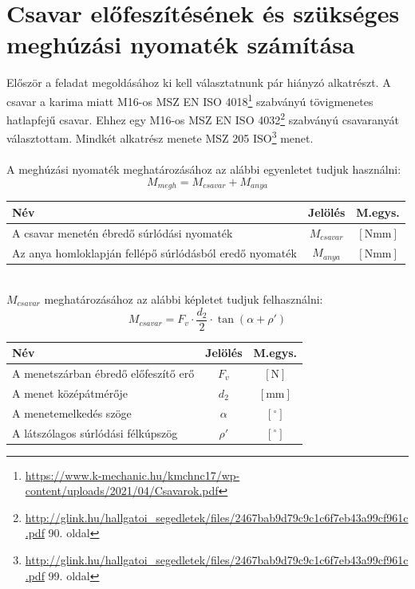 \documentclass[10pt, a4paper]{article}
\newcommand{\n}{\mathrm{\left[N\right]}}
\newcommand{\mm}{\mathrm{\left[mm\right]}}
\newcommand{\nmm}{\mathrm{\left[Nmm\right]}}
\newcommand{\szog}{\mathrm{\left[^{\circ}\right]}}
\begin{document}
	\section{Csavar előfeszítésének és szükséges meghúzási nyomaték számítása}
	Először a feladat megoldásához ki kell választatnunk pár hiányzó alkatrészt. A csavar a karima miatt M16-os MSZ EN ISO 4018\footnote{\url{https://www.k-mechanic.hu/kmchnc17/wp-content/uploads/2021/04/Csavarok.pdf}} szabványú tövigmenetes hatlapfejű csavar. Ehhez egy M16-os MSZ EN ISO 4032\footnote{\url{http://glink.hu/hallgatoi_segedletek/files/2467bab9d79c9c1c6f7eb43a99cf961c.pdf} 90. oldal} szabványú csavaranyát választottam. Mindkét alkatrész menete MSZ 205 ISO\footnote{\url{http://glink.hu/hallgatoi_segedletek/files/2467bab9d79c9c1c6f7eb43a99cf961c.pdf} 99. oldal} menet.\\\\
	A meghúzási nyomaték meghatározásához az alábbi egyenletet tudjuk használni:
	\begin{equation}
		M_{megh} = M_{csavar} + M_{anya} \tag{5}
	\end{equation}
	\vspace{-20pt}
	\renewcommand{\arraystretch}{1.4}
					\begin{table}[!h]
						\centering
						\begin{tabular}{l|c|c}
							\textbf{Név}                              & \textbf{Jelölés} & \textbf{M.egys.} \\ \hline
							A csavar menetén ébredő súrlódási nyomaték                      & $M_{csavar}$                & $\nmm$          \\
							Az anya homloklapján fellépő súrlódásból eredő nyomaték           & $M_{anya}$                & $\nmm$			     
						\end{tabular}
					\end{table}
	\renewcommand{\arraystretch}{1}\\
	$M_{csavar}$ meghatározásához az alábbi képletet tudjuk felhasználni:
	\begin{equation}
		M_{csavar} = F_v \cdot \dfrac{d_2}{2} \cdot \tan(\alpha + \rho') \tag{5.1}
	\end{equation}
	\vspace{-25pt}
	\renewcommand{\arraystretch}{1.4}
						\begin{table}[!h]
							\centering
							\begin{tabular}{l|c|c}
								\textbf{Név}                              & \textbf{Jelölés} & \textbf{M.egys.} \\ \hline
								A menetszárban ébredő előfeszítő erő                     & $F_v$                & $\n$          \\
								A menet középátmérője           & $d_2$                & $\mm$			 \\
								A menetemelkedés szöge           & $\alpha$                & $\szog$			 \\
								A látszólagos súrlódási félkúpszög           & $\rho'$                & $\szog$			       
							\end{tabular}
						\end{table}
\end{document}
